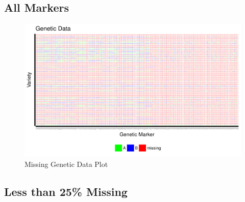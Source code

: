 \documentclass[11pt]{article}\usepackage[]{graphicx}\usepackage[]{color}
\makeatletter
\def\maxwidth{ %
  \ifdim\Gin@nat@width>\linewidth
    \linewidth
  \else
    \Gin@nat@width
  \fi
}
\newenvironment{knitrout}{}{} %
\makeatother
\begin{document}
\subsection{All Markers}

\begin{knitrout}\footnotesize
{}\color{fgcolor}\begin{figure}[H]

{\centering \includegraphics[width=\maxwidth]{figure/missing_plot-1} 

}

\caption[Missing Genetic Data Plot]{Missing Genetic Data Plot}\label{fig:missing.plot}
\end{figure}


\end{knitrout}


\pagebreak

\subsection{Less than 25\% Missing}
\end{document}
